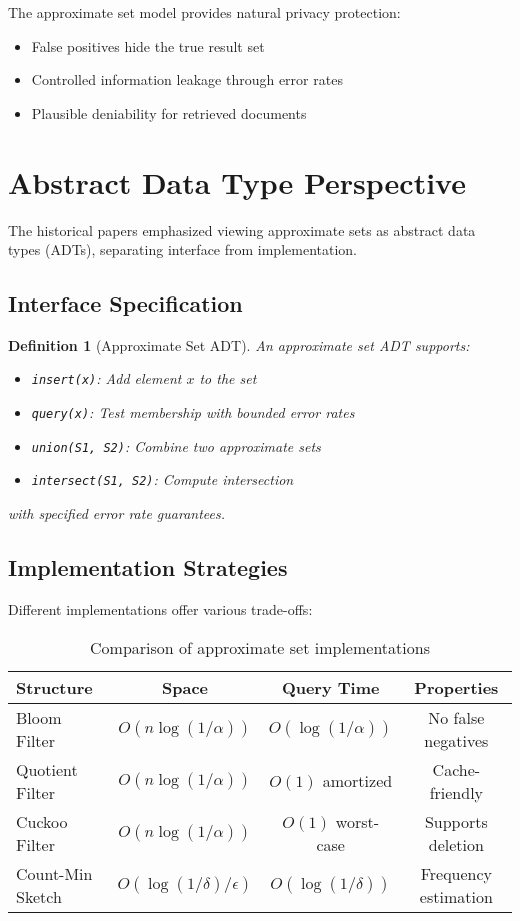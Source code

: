\documentclass[11pt]{article}
\newtheorem{definition}[theorem]{Definition}
\newcommand{\fprate}{\alpha}  %
\begin{document}
The approximate set model provides natural privacy protection:
\begin{itemize}
\item False positives hide the true result set
\item Controlled information leakage through error rates
\item Plausible deniability for retrieved documents
\end{itemize}

\section{Abstract Data Type Perspective}
\label{sec:adt}

The historical papers emphasized viewing approximate sets as abstract data types (ADTs), separating interface from implementation.

\subsection{Interface Specification}

\begin{definition}[Approximate Set ADT]
An approximate set ADT supports:
\begin{itemize}
\item \texttt{insert(x)}: Add element $x$ to the set
\item \texttt{query(x)}: Test membership with bounded error rates
\item \texttt{union(S1, S2)}: Combine two approximate sets
\item \texttt{intersect(S1, S2)}: Compute intersection
\end{itemize}
with specified error rate guarantees.
\end{definition}

\subsection{Implementation Strategies}

Different implementations offer various trade-offs:

\begin{table}[h]
\centering
\begin{tabular}{lccc}
\toprule
\textbf{Structure} & \textbf{Space} & \textbf{Query Time} & \textbf{Properties} \\
\midrule
Bloom Filter & $O(n \log(1/\fprate))$ & $O(\log(1/\fprate))$ & No false negatives \\
Quotient Filter & $O(n \log(1/\fprate))$ & $O(1)$ amortized & Cache-friendly \\
Cuckoo Filter & $O(n \log(1/\fprate))$ & $O(1)$ worst-case & Supports deletion \\
Count-Min Sketch & $O(\log(1/\delta) / \epsilon)$ & $O(\log(1/\delta))$ & Frequency estimation \\
\bottomrule
\end{tabular}
\caption{Comparison of approximate set implementations}
\end{table}
\end{document}
